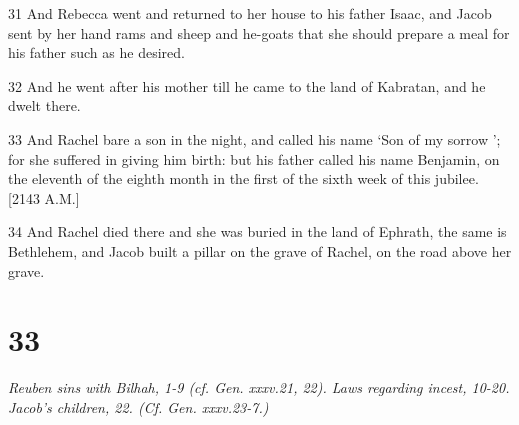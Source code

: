 \par 31 And Rebecca went and returned to her house to his father Isaac, and Jacob sent by her hand rams and sheep and he-goats that she should prepare a meal for his father such as he desired.
\par 32 And he went after his mother till he came to the land of Kabratan, and he dwelt there.
\par 33 And Rachel bare a son in the night, and called his name ‘Son of my sorrow ’; for she suffered in giving him birth: but his father called his name Benjamin, on the eleventh of the eighth month in the first of the sixth week of this jubilee. [2143 A.M.]
\par 34 And Rachel died there and she was buried in the land of Ephrath, the same is Bethlehem, and Jacob built a pillar on the grave of Rachel, on the road above her grave.

\chapter{33}

\par \textit{Reuben sins with Bilhah, 1-9 (cf. Gen. xxxv.21, 22). Laws regarding incest, 10-20. Jacob's children, 22. (Cf. Gen. xxxv.23-7.)}

